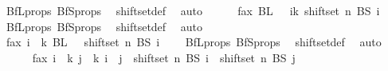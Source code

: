 \begin{isabellebody}
\ BfL{\isacharunderscore}{\kern0pt}props\ BfS{\isacharunderscore}{\kern0pt}props\ \isamarkupfalse%
\ shiftset{\isacharunderscore}{\kern0pt}def\ \isamarkupfalse%
\ auto\isanewline
\ \ \ \ \isamarkupfalse%
\ fax{}{\isacharcolon}{\kern0pt}\ {\isachardoublequoteopen}BL\ {}\ {\isasyminter}\ {\isacharparenleft}{\kern0pt}{\isasymUnion}i{\isasymin}{\isacharbraceleft}{\kern0pt}{\isachardot}{\kern0pt}{\isachardot}{\kern0pt}{\isacharless}{\kern0pt}k{\isacharbraceright}{\kern0pt}{\isachardot}{\kern0pt}\ shiftset\ n\ {\isacharparenleft}{\kern0pt}BS\ i{\isacharparenright}{\kern0pt}{\isacharparenright}{\kern0pt}\ {\isacharequal}{\kern0pt}\ {\isacharbraceleft}{\kern0pt}{\isacharbraceright}{\kern0pt}{\isachardoublequoteclose}\ \isamarkupfalse%
\ BfL{\isacharunderscore}{\kern0pt}props\ BfS{\isacharunderscore}{\kern0pt}props\ \isamarkupfalse%
\ shiftset{\isacharunderscore}{\kern0pt}def\ \isamarkupfalse%
\ auto\isanewline
\ \ \ \ \isamarkupfalse%
\ fax{}{\isacharcolon}{\kern0pt}\ {\isachardoublequoteopen}{\isasymforall}i\ {\isasymin}\ {\isacharbraceleft}{\kern0pt}{\isachardot}{\kern0pt}{\isachardot}{\kern0pt}{\isacharless}{\kern0pt}k{\isacharbraceright}{\kern0pt}{\isachardot}{\kern0pt}\ BL\ {}\ {\isasyminter}\ shiftset\ n\ {\isacharparenleft}{\kern0pt}BS\ i{\isacharparenright}{\kern0pt}\ {\isacharequal}{\kern0pt}\ {\isacharbraceleft}{\kern0pt}{\isacharbraceright}{\kern0pt}{\isachardoublequoteclose}\ \isamarkupfalse%
\ BfL{\isacharunderscore}{\kern0pt}props\ BfS{\isacharunderscore}{\kern0pt}props\ \isamarkupfalse%
\ shiftset{\isacharunderscore}{\kern0pt}def\ \isamarkupfalse%
\ auto\isanewline
\ \ \ \ \isamarkupfalse%
\ fax{}{\isacharcolon}{\kern0pt}\ {\isachardoublequoteopen}{\isasymforall}i\ {\isasymin}\ {\isacharbraceleft}{\kern0pt}{\isachardot}{\kern0pt}{\isachardot}{\kern0pt}{\isacharless}{\kern0pt}k{\isacharplus}{\kern0pt}{}{\isacharbraceright}{\kern0pt}{\isachardot}{\kern0pt}\ {\isasymforall}j\ {\isasymin}\ {\isacharbraceleft}{\kern0pt}{\isachardot}{\kern0pt}{\isachardot}{\kern0pt}{\isacharless}{\kern0pt}k{\isacharplus}{\kern0pt}{}{\isacharbraceright}{\kern0pt}{\isachardot}{\kern0pt}\ i\ {\isasymnoteq}\ j\ {\isasymlongrightarrow}\ shiftset\ n\ {\isacharparenleft}{\kern0pt}BS\ i{\isacharparenright}{\kern0pt}\ {\isasyminter}\ shiftset\ n\ {\isacharparenleft}{\kern0pt}BS\ j{\isacharparenright}{\kern0pt}\ {\isacharequal}{\kern0pt}\ {\isacharbraceleft}{\kern0pt}{\isacharbraceright}{\kern0pt}{\isachardoublequoteclose}\ \isamarkupfalse%

\end{isabellebody}
